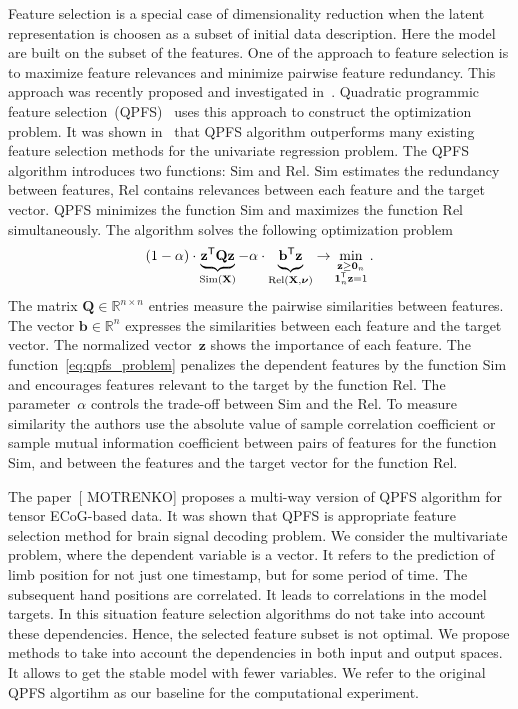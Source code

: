 \documentclass[12pt,oneside]{article}
\theoremstyle{definition}
\newcommand{\bz}{\mathbf{z}}
\newcommand{\bb}{\mathbf{b}}
\newcommand{\bX}{\mathbf{X}}
\newcommand{\bQ}{\mathbf{Q}}
\newcommand{\bbR}{\mathbb{R}}
\newcommand{\T}{\mathsf{T}}
\newcommand{\bnu}{\boldsymbol{\nu}}
\newcommand{\bOne}{\boldsymbol{1}}
\newcommand{\bZero}{\boldsymbol{0}}
\begin{document}
Feature selection is a special case of dimensionality reduction when the latent representation is choosen as a subset of initial data description. 
Here the model are built on the subset of the features. 
One of the approach to feature selection is to maximize feature relevances and minimize pairwise feature redundancy. 
This approach was recently proposed and investigated in~\cite{ding2005minimum,yamada2014high}.
Quadratic programmic feature selection~(QPFS)~\cite{rodriguez2010quadratic} uses this approach to construct the optimization problem. It was shown in~\cite{katrutsa2017comprehensive} that QPFS algorithm outperforms many existing feature selection methods for the univariate regression problem. 
The QPFS algorithm introduces two functions: $\text{Sim}$ and $\text{Rel}$.
$\text{Sim}$ estimates the redundancy between features, $\text{Rel}$ contains relevances between each feature and the target vector.
QPFS minimizes the function Sim and maximizes the function Rel simultaneously.
The algorithm solves the following optimization problem
\begin{equation}
(1 - \alpha) \cdot \underbrace{\bz^{\T} \bQ \bz}_{\text{Sim}(\bX)} - \alpha \cdot \underbrace{\vphantom{()} \bb^{\T} \bz}_{\text{Rel} (\bX, \bnu)} \rightarrow \min_{\substack{\bz \geq \bZero_n \\ \bOne_n^{\T} \bz=1}}.
\label{eq:qpfs_problem}
\end{equation}
The matrix $\bQ \in \bbR^{n \times n}$ entries measure the pairwise similarities between features.
The vector $\bb \in \bbR^n$ expresses the similarities between each feature and the target vector.
The normalized vector~$\bz$ shows the importance of each feature.
The function~\eqref{eq:qpfs_problem} penalizes the dependent features by the function Sim and encourages features relevant to the target by the function Rel.
The parameter~$\alpha$ controls the trade-off between Sim and the Rel.
To measure similarity the authors use the absolute value of sample correlation coefficient or sample mutual information coefficient between pairs of features for the function Sim, and between the features and the target vector for the function Rel.

The paper~[{\color{red} MOTRENKO}] proposes a multi-way version of QPFS algorithm for tensor ECoG-based data. 
It was shown that QPFS is appropriate feature selection method for brain signal decoding problem.
We consider the multivariate problem, where the dependent variable is a vector. 
It refers to the prediction of limb position for not just one timestamp, but for some period of time. 
The subsequent hand positions are correlated. 
It leads to correlations in the model targets. 
In this situation feature selection algorithms do not take into account these dependencies.
Hence, the selected feature subset is not optimal.
We propose methods to take into account the dependencies in both input and output spaces. 
It allows to get the stable model with fewer variables.
We refer to the original QPFS algortihm as our baseline for the computational experiment.
\end{document}
